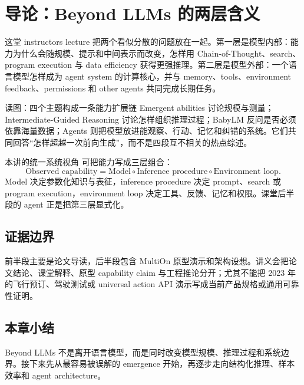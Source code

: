\section{导论：Beyond LLMs 的两层含义}

这堂 instructors lecture 把两个看似分散的问题放在一起。第一层是模型内部：能力为什么会随规模、提示和中间表示而改变，怎样用 Chain-of-Thought、search、program execution 与 data efficiency 获得更强推理。第二层是模型外部：一个语言模型怎样成为 agent system 的计算核心，并与 memory、tools、environment feedback、permissions 和 other agents 共同完成长期任务。


\begin{knowledgebox}{读图：四个主题构成一条能力扩展链}
Emergent abilities 讨论规模与测量；Intermediate-Guided Reasoning 讨论怎样组织推理过程；BabyLM 反问是否必须依靠海量数据；Agents 则把模型放进能观察、行动、记忆和纠错的系统。它们共同回答“怎样超越一次前向生成”，而不是四段互不相关的热点综述。
\end{knowledgebox}

\begin{importantbox}{本讲的统一系统视角}
可把能力写成三层组合：
\[
\text{Observed capability}
=\text{Model}
\circ\text{Inference procedure}
\circ\text{Environment loop}.
\]
Model 决定参数化知识与表征，inference procedure 决定 prompt、search 或 program execution，environment loop 决定工具、反馈、记忆和权限。课堂后半段的 agent 正是把第三层显式化。
\end{importantbox}

\subsection{证据边界}

前半段主要是论文导读，后半段包含 MultiOn 原型演示和架构设想。讲义会把论文结论、课堂解释、原型 capability claim 与工程推论分开；尤其不能把 2023 年的飞行预订、驾驶测试或 universal action API 演示写成当前产品规格或通用可靠性证明。

\subsection{本章小结}

Beyond LLMs 不是离开语言模型，而是同时改变模型规模、推理过程和系统边界。接下来先从最容易被误解的 emergence 开始，再逐步走向结构化推理、样本效率和 agent architecture。

